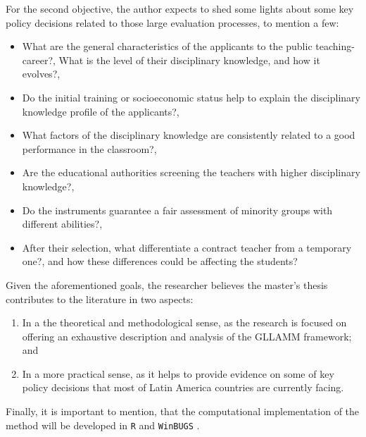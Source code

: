 \noindent For the second objective, the author expects to shed some lights about some key policy decisions related to those large evaluation processes, to mention a few:

\begin{itemize}

	\item What are the general characteristics of the applicants to the public teaching-career?, What is the level of their disciplinary knowledge, and how it evolves?, 
	
	\item Do the initial training or socioeconomic status help to explain the disciplinary knowledge profile of the applicants?,
	
	\item What factors of the disciplinary knowledge are consistently related to a good performance in the classroom?,
	
	\item Are the educational authorities screening the teachers with higher disciplinary knowledge?,
	
	\item Do the instruments guarantee a fair assessment of minority groups with different abilities?,
	
	\item After their selection, what differentiate a contract teacher from a temporary one?, and how these differences could be affecting the students?   
\end{itemize}

\noindent Given the aforementioned goals, the researcher believes the master's thesis contributes to the literature in two aspects: 

\begin{enumerate}
	\item In a the theoretical and methodological sense, as the research is focused on offering an exhaustive description and analysis of the GLLAMM framework; and 
	
	\item In a more practical sense, as it helps to provide evidence on some of key policy decisions that most of Latin America countries are currently facing.
\end{enumerate}

\noindent Finally, it is important to mention, that the computational implementation of the method will be developed in {\color{red} \texttt{R}} \cite{R2015} and {\color{red}\texttt{WinBUGS}} \cite{Lunn_et_al_2000}.




